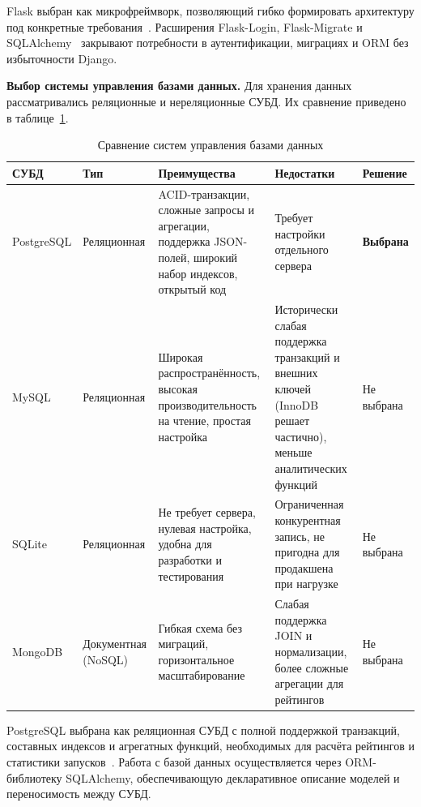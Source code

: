 Flask выбран как микрофреймворк, позволяющий гибко формировать архитектуру под
конкретные требования~\cite{flask_docs, grinberg2018flask}. Расширения Flask-Login,
Flask-Migrate и SQLAlchemy~\cite{sqlalchemy_docs} закрывают потребности в аутентификации,
миграциях и ORM без избыточности Django.

\textbf{Выбор системы управления базами данных.} Для хранения данных рассматривались
реляционные и нереляционные СУБД. Их сравнение приведено в таблице~\ref{tab:databases}.

\begin{table}[ht!]
    \centering
    \caption{Сравнение систем управления базами данных}
    \label{tab:databases}
    \small
    \begin{tabularx}{\textwidth}{|p{2.5cm}|p{2cm}|X|X|p{2.2cm}|}
        \hline
        \textbf{СУБД} & \textbf{Тип} & \textbf{Преимущества} & \textbf{Недостатки} & \textbf{Решение} \\ \hline
        PostgreSQL &
        Реляционная &
        ACID-транзакции, сложные запросы и агрегации, поддержка JSON-полей, широкий набор индексов, открытый код &
        Требует настройки отдельного сервера &
        \textbf{Выбрана} \\ \hline
        MySQL &
        Реляционная &
        Широкая распространённость, высокая производительность на чтение, простая настройка &
        Исторически слабая поддержка транзакций и внешних ключей (InnoDB решает частично), меньше аналитических функций &
        Не выбрана \\ \hline
        SQLite &
        Реляционная &
        Не требует сервера, нулевая настройка, удобна для разработки и тестирования &
        Ограниченная конкурентная запись, не пригодна для продакшена при нагрузке &
        Не выбрана \\ \hline
        MongoDB &
        Документная (NoSQL) &
        Гибкая схема без миграций, горизонтальное масштабирование &
        Слабая поддержка JOIN и нормализации, более сложные агрегации для рейтингов &
        Не выбрана \\ \hline
    \end{tabularx}
\end{table}

PostgreSQL выбрана как реляционная СУБД с полной поддержкой транзакций, составных
индексов и агрегатных функций, необходимых для расчёта рейтингов и статистики
запусков~\cite{postgresql_docs}. Работа с базой данных осуществляется через
ORM-библиотеку SQLAlchemy, обеспечивающую декларативное описание моделей и
переносимость между СУБД.

